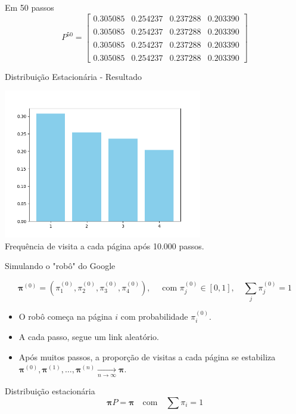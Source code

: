 \documentclass{beamer}
\begin{document}
\begin{frame}{Em 50 passos}
  \[
    P^{50} =
    \begin{bmatrix}
      0.305085 & 0.254237 & 0.237288 & 0.203390 \\\\
      0.305085 & 0.254237 & 0.237288 & 0.203390 \\\\
      0.305085 & 0.254237 & 0.237288 & 0.203390 \\\\
      0.305085 & 0.254237 & 0.237288 & 0.203390
    \end{bmatrix}
\]
\end{frame}


\begin{frame}{Distribuição Estacionária - Resultado}
\begin{center}
\includegraphics[width=0.65\textwidth]{stationary_dist.png} \\
Frequência de visita a cada página após 10.000 passos.
\end{center}
\end{frame}


\begin{frame}{Simulando o "robô" do Google}

  $$ \bm{\pi}^{(0)} = \left(\pi_1^{(0)},\pi_2^{(0)},\pi_3^{(0)},\pi_4^{(0)}\right), \quad\text{ com } \pi_j^{(0)}\in[0,1],\quad\sum_j\pi_j^{(0)}=1$$
  
  \begin{itemize}
  \item O robô começa na página $i$ com probabilidade $\pi_i^{(0)}$.
  \item A cada passo, segue um link aleatório.
  \item Após muitos passos, a proporção de visitas a cada página se
    estabiliza $\bm{\pi}^{(0)}, \bm{\pi}^{(1)}, \dots, \bm{\pi}^{(n)} \xrightarrow[n\to\infty]{}  \bm{\pi}$. 
  \end{itemize}
  \begin{block}{Distribuição estacionária}
    \[ \bm\pi P = \bm\pi \quad \text{com} \quad \sum \pi_i = 1 \]
  \end{block}
\end{frame}
\end{document}
